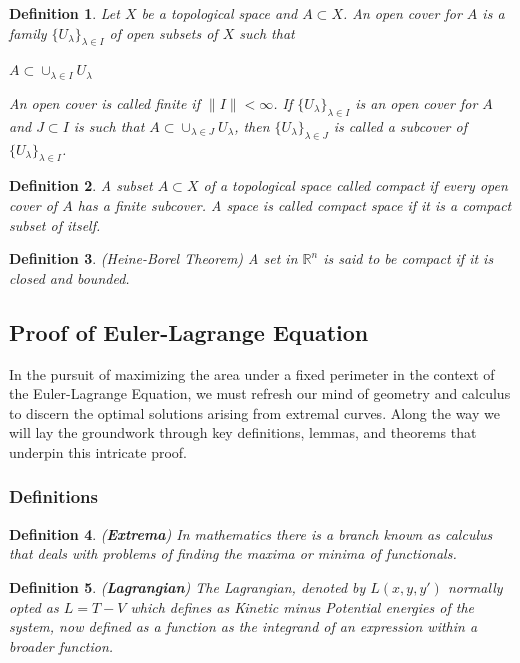 \documentclass[a4paper]{book}
\newtheorem{definition}{Definition}%
\begin{document}
\begin{definition}
    Let $X$ be a topological space and $A \subset X$. An open cover for $A$ is a family $\{U_\lambda\}_{\lambda\in I}$ of open subsets of $X$ such that
    \begin{center}
        $A \subset \cup_{\lambda\in I}{U_\lambda}$
    \end{center}
    An open cover is called finite if $\|I\|<\infty$. If $\{U_\lambda\}_{\lambda\in I}$ is an open cover for $A$ and $J \subset I$ is such that $A\subset\cup_{\lambda\in J}{U_\lambda}$, then $\{U_\lambda\}_{\lambda\in J}$ is called a subcover of $\{U_\lambda\}_{\lambda\in I}$.
\end{definition}

\begin{definition}
    A subset $A \subset X$ of a topological space called compact if every open cover of $A$ has a finite subcover. A space is called compact space if it is a compact subset of itself.
\end{definition}

\begin{definition} (Heine-Borel Theorem)
    A set in $\mathbb{R}^n$ is said to be compact if it is closed and bounded.
\end{definition}

\subsection{Proof of Euler-Lagrange Equation}
In the pursuit of maximizing the area under a fixed perimeter in the context of the Euler-Lagrange Equation, we must refresh our mind of geometry and calculus to discern the optimal solutions arising from extremal curves. Along the way we will lay the groundwork through key definitions, lemmas, and theorems that underpin this intricate proof.

\subsubsection{Definitions}
\begin{definition}(\textbf{Extrema})
    In mathematics there is a branch known as calculus that deals with problems of finding the maxima or minima of functionals.
\end{definition}

\begin{definition}(\textbf{Lagrangian})
    The Lagrangian, denoted by \(L(x, y, y')\) normally opted as \(L = T - V\) which defines as Kinetic minus Potential energies of the system, now defined as a function as the integrand of an expression within a broader function.
\end{definition}
\end{document}
